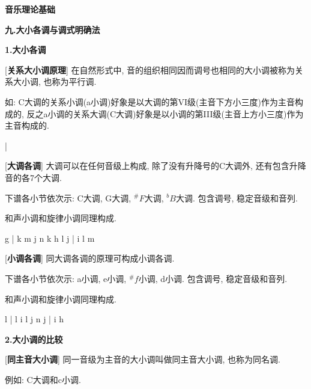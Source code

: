 

\begin{center} 
 \Large \textbf{音乐理论基础}\par
 \textbf{九.大小各调与调式明确法}
\end{center}

\large 
\begin{center}
 \textbf{1.大小各调}\\
\end{center}

[\textbf{关系大小调原理}] 在自然形式中, 音的组织相同因而调号也相同的大小调被称为关系大小调, 也称为平行调.\par
\qquad 如: C大调的关系小调(a小调)好象是以大调的第VI级(主音下方小三度)作为主音构成的, 反之a小调的关系大调(C大调)好象是以小调的第III级(主音上方小三度)作为主音构成的.\par
\startextract
\Notes {}\en\bar
\Notes {}\en
\zendextract

[\textbf{大调各调}] 大调可以在任何音级上构成, 除了没有升降号的C大调外, 还有包含升降音的各7个大调.\par
\qquad 下谱各小节依次示: C大调, G大调, $^\# F$大调, $^b B$大调. 包含调号, 稳定音级和音列.\par
\qquad 和声小调和旋律小调同理构成.\par
\startextract
\Notes {}\wh g \en\bar
\Notes {} \wh k \en
\zendextract
\startextract {}
\Notes \sh m \sh j \sh n \sh k \sh h \sh l \wh j \en\bar
\Notes \fl i \fl l \wh m \en
\zendextract

[\textbf{小调各调}] 同大调各调的原理可构成小调各调.\par
\qquad 下谱各小节依次示: a小调, e小调, $^\# f$小调, d小调. 包含调号, 稳定音级和音列.\par
\qquad 和声小调和旋律小调同理构成.\par
\startextract
\Notes {}\wh l \en\bar
\Notes \sh l \wh i \en
\zendextract
\startextract {}
\Notes \sh l \sh j \sh n \wh j \en\bar
\Notes \fl i \wh h  \en
\zendextract

\clearpage

\begin{center}
 \textbf{2.大小调的比较}\\
\end{center}

[\textbf{同主音大小调}] 同一音级为主音的大小调叫做同主音大小调, 也称为同名调. \par
\qquad 例如: C大调和c小调.\par

